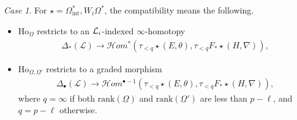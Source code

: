 \documentclass[12pt, a4paper]{article}
\begin{document}
\iffalse
\emph{Case 1}. For $\star=\Omega^*_\mathrm{int},W_i\Omega^*$, the compatibility means the following.
\begin{itemize}
    \item 
$\mathrm{Ho}_{\underline \Omega}$ restricts to an $\mathcal L_{\uppercase\expandafter{\romannumeral1}}$-indexed $\infty$-homotopy 
    \begin{eqnarray}\label{compatibility 1}
    \Delta_*(\mathcal L)\to\mathcal Hom^*(\tau_{<q}\star(E,\theta),\tau_{<q}F_*\star(H,\nabla)),
    \end{eqnarray}
\item  $\mathrm{Ho}_{\underline\Omega,\underline\Omega'}$ restricts to a graded morphism  
   \begin{eqnarray}\label{compatibility 2}
\Delta_\bullet(\mathcal L)\to\mathcal Hom^{\bullet-1}(\tau_{<q}\star(E,\theta),\tau_{<q}F_*\star(H,\nabla)),
    \end{eqnarray}
    where $q = \infty$ if both $\mathrm{rank}(\underline{\Omega})$ and $\mathrm{rank}(\underline{\Omega}')$ are less than $p - \ell$, and $q = p - \ell$ otherwise.
\end{itemize}
\end{document}
